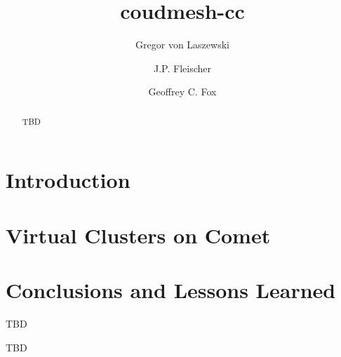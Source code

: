 \documentclass[sigconf,hyphens]{acmart}
\begin{document}
\title{coudmesh-cc}


\author{Gregor von Laszewski}
\author{J.P. Fleischer}
\author{Geoffrey C. Fox}

\renewcommand{\shortauthors}{von Laszewski, et al.}

\newcommand{\TODO}[1]{\todo[inline]{#1}}

\begin{abstract}

  TBD
  
\end{abstract}




\maketitle

\section{Introduction}\label{sec:intro}


\section{Virtual Clusters on Comet}\label{sec:vc}




\section{Conclusions and Lessons Learned}\label{sec:conclusion}

TBD

\begin{acks}

  TBD

\end{acks}



\end{document}
